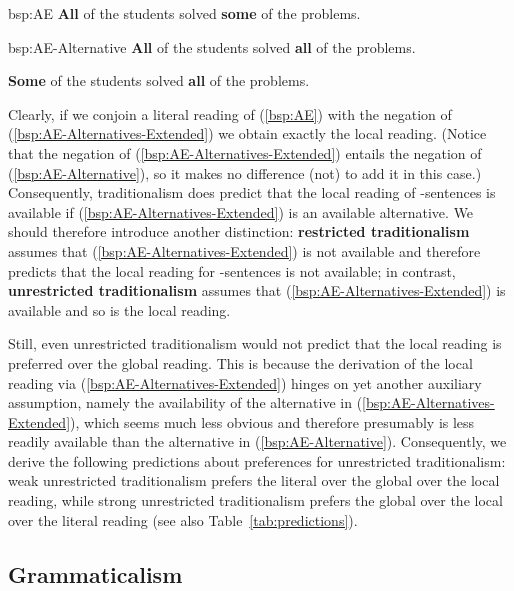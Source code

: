 \documentclass[fleqn,reqno,10pt,draft]{article}
\newcommand{\as}{\acro{as}}
\renewcommand{\mymark}[1]{\textbf{#1}}
\begin{document}
\begin{exer}{bsp:AE}
  \ex \mymark{All} of the students solved \mymark{some} of the problems.
\end{exer}

\begin{exer}{bsp:AE-Alternative}
  \ex \mymark{All} of the students solved \mymark{all} of the problems.
\end{exer}

\begin{exe}
\ex \label{bsp:AE-Alternatives-Extended} \mymark{Some} of the students solved \mymark{all} of the problems.
\end{exe}

\noindent Clearly, if we conjoin a literal reading of (\ref{bsp:AE})
with the negation of (\ref{bsp:AE-Alternatives-Extended}) we obtain
exactly the local reading. (Notice that the negation of
(\ref{bsp:AE-Alternatives-Extended}) entails the negation of
(\ref{bsp:AE-Alternative}), so it makes no difference (not) to add it
in this case.) Consequently, traditionalism does predict that the
local reading of \as-sentences is available if
(\ref{bsp:AE-Alternatives-Extended}) is an available alternative. We
should therefore introduce another distinction: \mymark{restricted
  traditionalism} assumes that (\ref{bsp:AE-Alternatives-Extended}) is
not available and therefore predicts that the local reading for
\as-sentences is not available; in contrast, \mymark{unrestricted
  traditionalism} assumes that (\ref{bsp:AE-Alternatives-Extended}) is
available and so is the local reading.

Still, even unrestricted traditionalism would not predict that the
local reading is preferred over the global reading. This is because
the derivation of the local reading via
(\ref{bsp:AE-Alternatives-Extended}) hinges on yet another auxiliary
assumption, namely the availability of the alternative in
(\ref{bsp:AE-Alternatives-Extended}), which seems much less obvious
and therefore presumably is less readily available than the
alternative in (\ref{bsp:AE-Alternative}). Consequently, we derive the
following predictions about preferences for unrestricted
traditionalism: weak unrestricted traditionalism prefers the literal
over the global over the local reading, while strong unrestricted
traditionalism prefers the global over the local over the literal
reading (see also Table~\ref{tab:predictions}).

\subsection{Grammaticalism}
\label{sec:grammaticalism}
\end{document}
